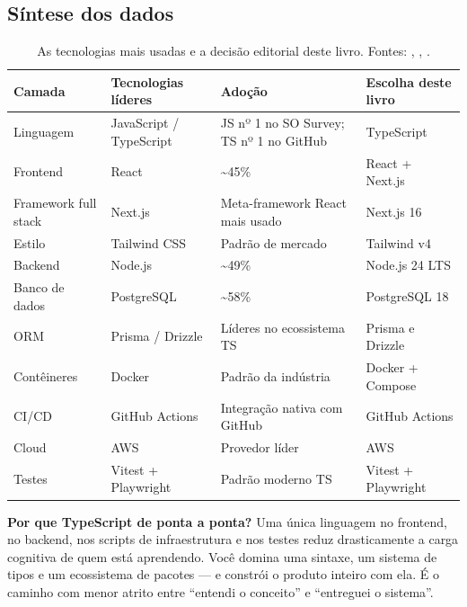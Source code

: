 \subsection{Síntese dos dados}
\begin{table}[h]
\centering
\small
\caption{As tecnologias mais usadas e a decisão editorial deste livro.
Fontes: \cite{so2025}, \cite{octoverse2025}, \cite{stateofjs2024}.}
\label{tab:mercado}
\begin{tabularx}{\textwidth}{@{}>{\hsize=0.8\hsize\raggedright\arraybackslash}X >{\hsize=1.2\hsize\raggedright\arraybackslash}X >{\hsize=1.0\hsize\raggedright\arraybackslash}X >{\hsize=1.0\hsize\raggedright\arraybackslash}X@{}}
\toprule
\textbf{Camada} & \textbf{Tecnologias líderes} & \textbf{Adoção} & \textbf{Escolha deste livro} \\
\midrule
Linguagem & JavaScript / TypeScript & JS nº 1 no SO Survey; TS nº 1 no GitHub & TypeScript \\
Frontend & React & \textasciitilde 45\% & React + Next.js \\
Framework full stack & Next.js & Meta-framework React mais usado & Next.js 16 \\
Estilo & Tailwind CSS & Padrão de mercado & Tailwind v4 \\
Backend & Node.js\index{Node.js} & \textasciitilde 49\% & Node.js 24 LTS \\
Banco de dados & PostgreSQL\index{PostgreSQL} & \textasciitilde 58\% & PostgreSQL 18 \\
ORM & Prisma / Drizzle & Líderes no ecossistema TS & Prisma e Drizzle \\
Contêineres & Docker & Padrão da indústria & Docker + Compose \\
CI/CD & GitHub Actions & Integração nativa com GitHub & GitHub Actions \\
Cloud & AWS & Provedor líder & AWS \\
Testes & Vitest + Playwright & Padrão moderno TS & Vitest + Playwright \\
\bottomrule
\end{tabularx}
\end{table}

\begin{caixaconceito}
\textbf{Por que TypeScript de ponta a ponta?} Uma única linguagem no frontend,
no backend, nos scripts de infraestrutura e nos testes reduz drasticamente a
carga cognitiva de quem está aprendendo. Você domina uma sintaxe, um sistema de
tipos e um ecossistema de pacotes — e constrói o produto inteiro com ela. É o
caminho com menor atrito entre ``entendi o conceito'' e ``entreguei o sistema''.
\end{caixaconceito}


